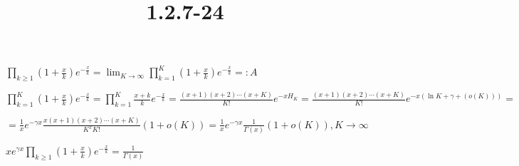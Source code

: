 \documentclass{article}
\title{1.2.7-24}
\begin{document}
\maketitle

\( \prod_{k \geq 1} (1+\frac{x}{k})e^{-\frac{x}{k}} = \lim_{K \to \infty} \prod_{k = 1}^K (1+\frac{x}{k})e^{-\frac{x}{k}} =: A \)

\( \prod_{k = 1}^K (1+\frac{x}{k})e^{-\frac{x}{k}} = \prod_{k = 1}^K \frac{x+k}{k}e^{-\frac{x}{k}} = \frac{(x+1)(x+2)\cdots(x+K)}{K!}e^{-xH_K} = \frac{(x+1)(x+2)\cdots(x+K)}{K!}e^{-x(\ln{K} + \gamma + (o(K)))} = \)

\( = \frac{1}{x}e^{-\gamma x} \frac{x(x+1)(x+2)\cdots(x+K)}{K^x K!} (1 + o(K)) = \frac{1}{x} e^{-\gamma x} \frac{1}{\Gamma(x)} (1 + o(K)), K \to \infty \)

\( xe^{\gamma x} \prod_{k \geq 1} (1+\frac{x}{k})e^{-\frac{x}{k}} = \frac{1}{\Gamma(x)} \)
\end{document}
